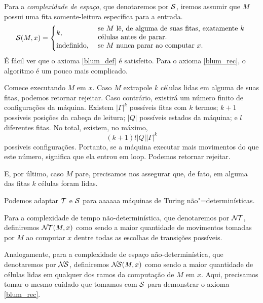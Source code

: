 \begin{example}
    \label{complexidade_espaco}
    Para a \emph{complexidade de espaço},
    que denotaremos por ${\mathcal{S}}$,
    iremos assumir que $M$ possui uma fita somente-leitura
    específica para a entrada.
    \begin{equation*}
        \PhiDS(M, x) = \begin{cases}
            k, & \text{
                \parbox{0.6\textwidth}{%
                    se $M$ lê, de alguma de suas fitas,
                    exatamente $k$ células
                    antes de parar.
                }
            } \\
            \text{indefinido}, & \text{
                \parbox{0.6\textwidth}{
                    se $M$ nunca parar ao computar $x$.
                }
            }
        \end{cases}
    \end{equation*}
    É fácil ver que o axioma \ref{blum_def} é satisfeito.
    Para o axioma \ref{blum_rec},
    o algoritmo é um pouco mais complicado.

    Comece executando $M$ em $x$.
    Caso $M$ extrapole $k$ células lidas
    em alguma de suas fitas,
    podemos retornar rejeitar.
    Caso contrário,
    existirá um número finito de configurações da máquina.
    Existem $|\Gamma|^k$ possíveis fitas com $k$ termos;
    $k+1$ possíveis posições da cabeça de leitura;
    $|Q|$ possíveis estados da máquina;
    e $l$ diferentes fitas.
    No total, existem, no máximo,
    \begin{equation*}
        (k+1) l |Q||\Gamma|^k
    \end{equation*}
    possíveis configurações.
    Portanto, se a máquina executar
    mais movimentos do que este número,
    significa que ela entrou em loop.
    Podemos retornar rejeitar.

    E, por último,
    caso $M$ pare,
    precisamos nos assegurar que,
    de fato,
    em alguma das fitas $k$ células foram lidas.
\end{example}

\begin{example}
    Podemos adaptar ${\mathcal{T}}$ e ${\mathcal{S}}$
    para aaaaaa máquinas de Turing não"=determinísticas.

    Para a complexidade de tempo não-determinística,
    que denotaremos por ${\mathcal{N\!T}}$,
    definiremos ${\mathcal{N\!T}}(M, x)$
    como sendo a maior quantidade de movimentos
    tomadas por $M$ ao computar $x$
    dentre todas as escolhas de transições possíveis.

    Analogamente,
    para a complexidade de espaço não-determinística,
    que denotaremos por ${\mathcal{N\!S}}$,
    definiremos ${\mathcal{N\!S}}(M, x)$
    como sendo a maior quantidade de células lidas
    em qualquer dos ramos da computação de $M$ em $x$.
    Aqui, precisamos tomar o mesmo cuidado que tomamos
    com ${\mathcal{S}}$ para demonstrar o axioma \ref{blum_rec}.
\end{example}

